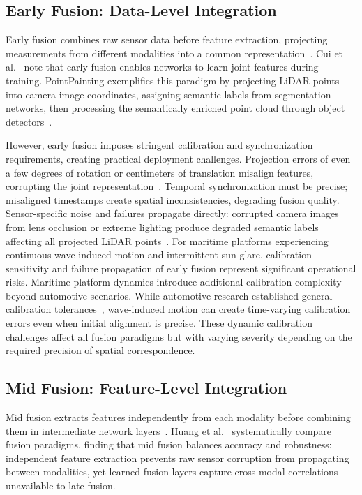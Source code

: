 \documentclass{erauthesis}
\begin{document}
\subsection{Early Fusion: Data-Level Integration}

Early fusion combines raw sensor data before feature extraction, projecting measurements from different modalities into a common representation~\cite{cui2022}.
Cui et al.~\cite{cui2022} note that early fusion enables networks to learn joint features during training.
PointPainting exemplifies this paradigm by projecting \ac{LiDAR} points into camera image coordinates, assigning semantic labels from segmentation networks, then processing the semantically enriched point cloud through object detectors~\cite{cui2022}.

However, early fusion imposes stringent calibration and synchronization requirements, creating practical deployment challenges.
Projection errors of even a few degrees of rotation or centimeters of translation misalign features, corrupting the joint representation~\cite{cui2022}.
Temporal synchronization must be precise; misaligned timestamps create spatial inconsistencies, degrading fusion quality.
Sensor-specific noise and failures propagate directly: corrupted camera images from lens occlusion or extreme lighting produce degraded semantic labels affecting all projected \ac{LiDAR} points~\cite{cui2022}.
For maritime platforms experiencing continuous wave-induced motion and intermittent sun glare, calibration sensitivity and failure propagation of early fusion represent significant operational risks.
Maritime platform dynamics introduce additional calibration complexity beyond automotive scenarios.
While automotive research established general calibration tolerances~\cite{cui2022}, wave-induced motion can create time-varying calibration errors even when initial alignment is precise.
These dynamic calibration challenges affect all fusion paradigms but with varying severity depending on the required precision of spatial correspondence.

\subsection{Mid Fusion: Feature-Level Integration}

Mid fusion extracts features independently from each modality before combining them in intermediate network layers~\cite{huang2024a}.
Huang et al.~\cite{huang2024a} systematically compare fusion paradigms, finding that mid fusion balances accuracy and robustness: independent feature extraction prevents raw sensor corruption from propagating between modalities, yet learned fusion layers capture cross-modal correlations unavailable to late fusion.
\end{document}
